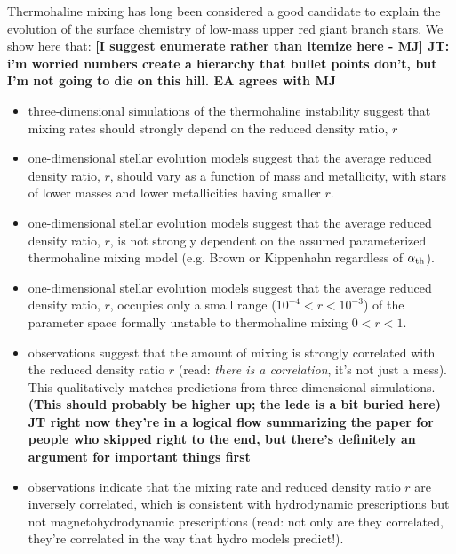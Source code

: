 Thermohaline mixing has long been considered a good candidate to explain the evolution of the surface chemistry of low-mass upper red giant branch stars. We show here that:
\textbf{[I suggest enumerate rather than itemize here - MJ] JT: i'm worried numbers create a hierarchy that bullet points don't, but I'm not going to die on this hill. EA agrees with MJ}
\begin{itemize}
    \item three-dimensional simulations of the thermohaline instability suggest that mixing rates should strongly depend on the reduced density ratio, $r$
    
    \item one-dimensional stellar evolution models suggest that the average reduced density ratio, $r$, should vary as a function of mass and metallicity, with stars of lower masses and lower metallicities having smaller $r$.
    
    \item one-dimensional stellar evolution models suggest that the average reduced density ratio, $r$, is not strongly dependent on the assumed parameterized thermohaline mixing model (e.g. Brown or Kippenhahn regardless of $\alpha_{\rm th}$).
    
    \item one-dimensional stellar evolution models suggest that the average reduced density ratio, $r$, occupies only a small range ($10^{-4}<r<10^{-3}$) of the parameter space formally unstable to thermohaline mixing $0<r<1$.
    
    \item observations suggest that the amount of mixing is strongly correlated with the reduced density ratio $r$ (read: \emph{there is a correlation}, it's not just a mess). This qualitatively matches predictions from three dimensional simulations. {\bf (This should probably be higher up; the lede is a bit buried here) JT right now they're in a logical flow summarizing the paper for people who skipped right to the end, but there's definitely an argument for important things first}
    
    \item observations indicate that the mixing rate and reduced density ratio $r$ are inversely correlated, which is consistent with hydrodynamic prescriptions but not magnetohydrodynamic prescriptions (read: not only are they correlated, they're correlated in the way that hydro models predict!).
    
    \end{itemize}


